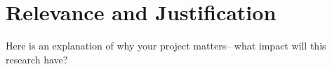 \section{Relevance and Justification}

Here is an explanation of why your project matters-- what impact will this research have?
